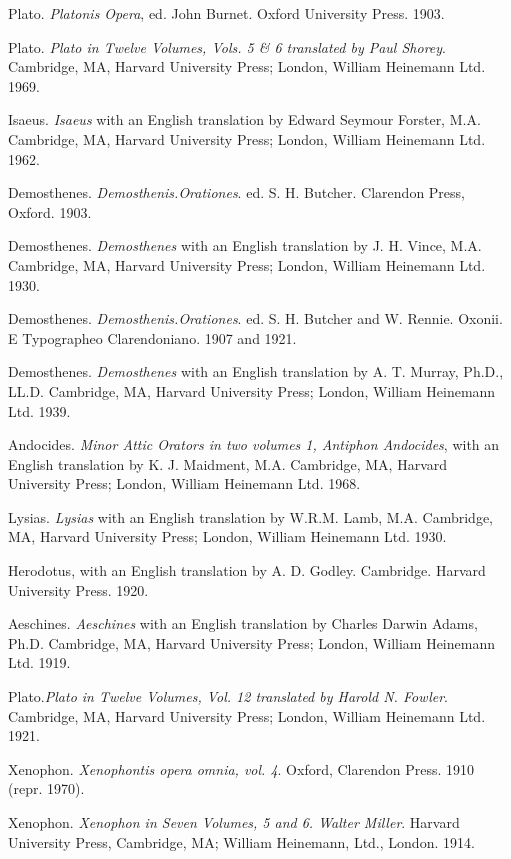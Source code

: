 \documentclass[a4paper,twocolumn,twoside,notitlepage,10pt]{article}
\begin{document}
\begin{description} %
    \item Plato. \emph{Platonis Opera}, ed. John Burnet. Oxford University Press. 1903.
    \item Plato. \emph{Plato in Twelve Volumes, Vols. 5 \& 6 translated by Paul Shorey}. Cambridge, MA, Harvard University Press; London, William Heinemann Ltd. 1969.

    \item Isaeus. \emph{Isaeus} with an English translation by Edward Seymour Forster, M.A. Cambridge, MA, Harvard University Press; London, William Heinemann Ltd. 1962.

    \item Demosthenes. \emph{Demosthenis.Orationes}. ed. S. H. Butcher. Clarendon Press, Oxford. 1903.
    \item Demosthenes. \emph{Demosthenes} with an English translation by J. H. Vince, M.A. Cambridge, MA, Harvard University Press; London, William Heinemann Ltd. 1930.

    \item Demosthenes. \emph{Demosthenis.Orationes}. ed. S. H. Butcher and W. Rennie. Oxonii. E Typographeo Clarendoniano. 1907 and 1921.
    \item Demosthenes. \emph{Demosthenes} with an English translation by A. T. Murray, Ph.D., LL.D. Cambridge, MA, Harvard University Press; London, William Heinemann Ltd. 1939.

    \item Andocides. \emph{Minor Attic Orators in two volumes 1, Antiphon Andocides}, with an English translation by K. J. Maidment, M.A. Cambridge, MA, Harvard University Press; London, William Heinemann Ltd. 1968.
    \item Lysias. \emph{Lysias} with an English translation by W.R.M. Lamb, M.A. Cambridge, MA, Harvard University Press; London, William Heinemann Ltd. 1930.
\end{description}

\begin{description} %
	\item Herodotus, with an English translation by A. D. Godley. Cambridge. Harvard University Press. 1920.
	\item Aeschines. \emph{Aeschines} with an English translation by Charles Darwin Adams, Ph.D. Cambridge, MA, Harvard University Press; London, William Heinemann Ltd. 1919.
\end{description}

\begin{description} %
 	\item Plato.\emph{Plato in Twelve Volumes, Vol. 12 translated by Harold N. Fowler}. Cambridge, MA, Harvard University Press; London, William Heinemann Ltd. 1921.
	\item Xenophon. \emph{Xenophontis opera omnia, vol. 4}. Oxford, Clarendon Press. 1910 (repr. 1970).
	\item Xenophon. \emph{Xenophon in Seven Volumes, 5 and 6. Walter Miller}. Harvard University Press, Cambridge, MA; William Heinemann, Ltd., London. 1914.
\end{description}

\onecolumn
\printindex[eng]
\printindex[grc]
\end{document}
